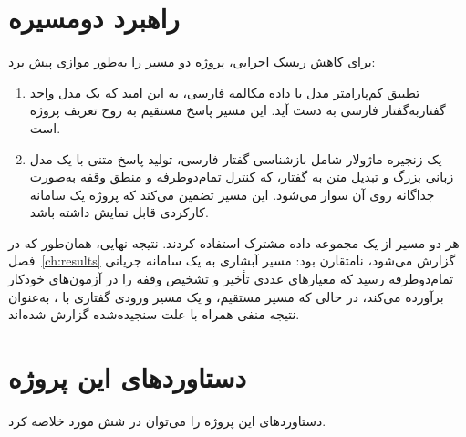 \section{راهبرد دومسیره}
\label{sec:two-track}

برای کاهش ریسک اجرایی، پروژه دو مسیر را به‌طور موازی پیش برد:

\begin{enumerate}
\item {} تطبیق کم‌پارامتر مدل  با داده مکالمه
      فارسی، به این امید که یک مدل واحد گفتار‌به‌گفتار فارسی به دست آید. این
      مسیر پاسخ مستقیم به روح تعریف پروژه است.
\item {} یک زنجیره ماژولار شامل بازشناسی گفتار فارسی، تولید
      پاسخ متنی با یک مدل زبانی بزرگ و تبدیل متن به گفتار، که کنترل
      تمام‌دوطرفه و منطق وقفه به‌صورت جداگانه روی آن سوار می‌شود. این مسیر
      تضمین می‌کند که پروژه یک سامانه کارکردی قابل نمایش داشته باشد.
\end{enumerate}

هر دو مسیر از یک مجموعه داده مشترک استفاده کردند. نتیجه نهایی، همان‌طور که در
فصل~\ref{ch:results} گزارش می‌شود، نامتقارن بود: مسیر آبشاری به یک سامانه
جریانی تمام‌دوطرفه رسید که معیارهای عددی تأخیر و تشخیص وقفه را در آزمون‌های
خودکار برآورده می‌کند، در حالی که مسیر مستقیم، و یک مسیر ورودی گفتاری با
، به‌عنوان نتیجه منفی همراه با علت سنجیده‌شده گزارش شده‌اند.

\section{دستاوردهای این پروژه}
\label{sec:contributions}

دستاوردهای این پروژه را می‌توان در شش مورد خلاصه کرد.

